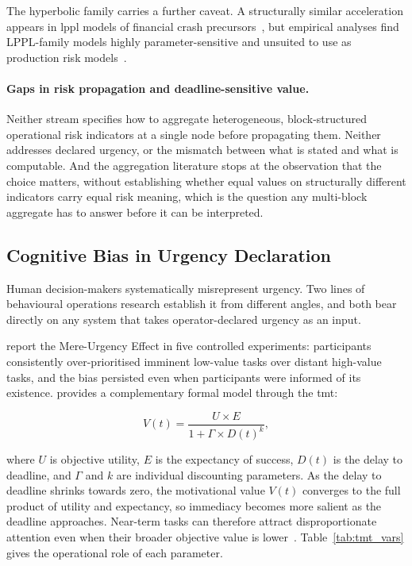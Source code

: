 The hyperbolic family carries a further caveat. A structurally similar acceleration appears
in \gls{lppl} models of financial crash
precursors~\autocite{johansen2001finite,johansen2000crashes}, but empirical analyses find
LPPL-family models highly parameter-sensitive and unsuited to use as production risk
models~\autocite{feigenbaum2001statistical,bree2010prediction}.

\paragraph{Gaps in risk propagation and deadline-sensitive value.}
Neither stream specifies how to aggregate heterogeneous, block-structured operational risk
indicators at a single node before propagating them. Neither addresses declared urgency, or
the mismatch between what is stated and what is computable. And the aggregation literature
stops at the observation that the choice matters, without establishing whether equal values
on structurally different indicators carry equal risk meaning, which is the question any
multi-block aggregate has to answer before it can be interpreted.

\subsection{Cognitive Bias in Urgency Declaration}
\label{sec:lit_bias}

Human decision-makers systematically misrepresent urgency. Two lines of behavioural
operations research establish it from different angles, and both bear directly on any
system that takes operator-declared urgency as an input.

\textcite{zhu2018mere} report the Mere-Urgency Effect in five controlled experiments:
participants consistently over-prioritised imminent low-value tasks over distant
high-value tasks, and the bias persisted even when participants were informed of its
existence. \textcite{steel2006integrating} provides a complementary formal model
through the \gls{tmt}:

\begin{equation}
    V(t) = \frac{U \times E}{1 + \Gamma \times D(t)^k},
    \label{eq:tmt_val}
\end{equation}

where $U$ is objective utility, $E$ is the expectancy of success, $D(t)$ is the delay to
deadline, and $\Gamma$ and $k$ are individual discounting parameters. As the delay to
deadline shrinks towards zero, the motivational value $V(t)$ converges to the full product
of utility and expectancy, so immediacy becomes more salient as the deadline approaches.
Near-term tasks can therefore attract disproportionate attention even when their broader
objective value is lower~\autocite{steel2006integrating}.
Table~\ref{tab:tmt_vars} gives the operational role of each parameter.

